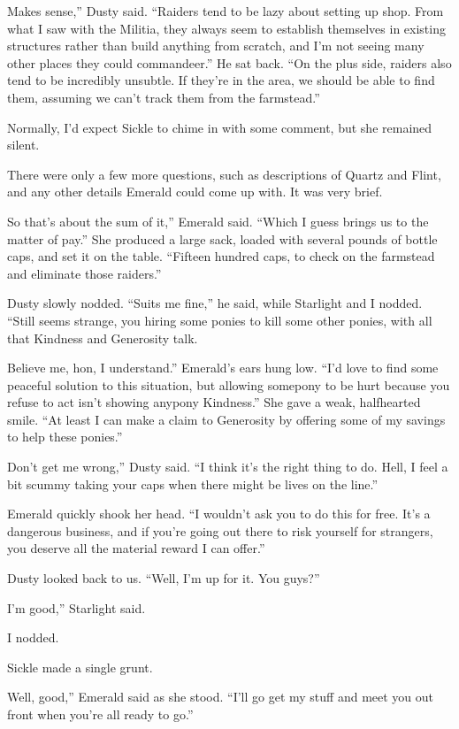 \leavevmode{}Makes sense,” Dusty said. “Raiders tend to be lazy about setting up shop. From what I saw with the Militia, they always seem to establish themselves in existing structures rather than build anything from scratch, and I’m not seeing many other places they could commandeer.” He sat back. “On the plus side, raiders also tend to be incredibly unsubtle. If they’re in the area, we should be able to find them, assuming we can’t track them from the farmstead.”

Normally, I’d expect Sickle to chime in with some comment, but she remained silent.

There were only a few more questions, such as descriptions of Quartz and Flint, and any other details Emerald could come up with. It was very brief.

\leavevmode{}So that’s about the sum of it,” Emerald said. “Which I guess brings us to the matter of pay.” She produced a large sack, loaded with several pounds of bottle caps, and set it on the table. “Fifteen hundred caps, to check on the farmstead and eliminate those raiders.”

Dusty slowly nodded. “Suits me fine,” he said, while Starlight and I nodded. “Still seems strange, you hiring some ponies to kill some other ponies, with all that Kindness and Generosity talk.

\leavevmode{}Believe me, hon, I understand.” Emerald’s ears hung low. “I’d love to find some peaceful solution to this situation, but allowing somepony to be hurt because you refuse to act isn’t showing anypony Kindness.” She gave a weak, halfhearted smile. “At least I can make a claim to Generosity by offering some of my savings to help these ponies.”

\leavevmode{}Don’t get me wrong,” Dusty said. “I think it’s the right thing to do. Hell, I feel a bit scummy taking your caps when there might be lives on the line.”

Emerald quickly shook her head. “I wouldn’t ask you to do this for free. It’s a dangerous business, and if you’re going out there to risk yourself for strangers, you deserve all the material reward I can offer.”

Dusty looked back to us. “Well, I’m up for it. You guys?”

\leavevmode{}I’m good,” Starlight said.

I nodded.

Sickle made a single grunt.

\leavevmode{}Well, good,” Emerald said as she stood. “I’ll go get my stuff and meet you out front when you’re all ready to go.”

